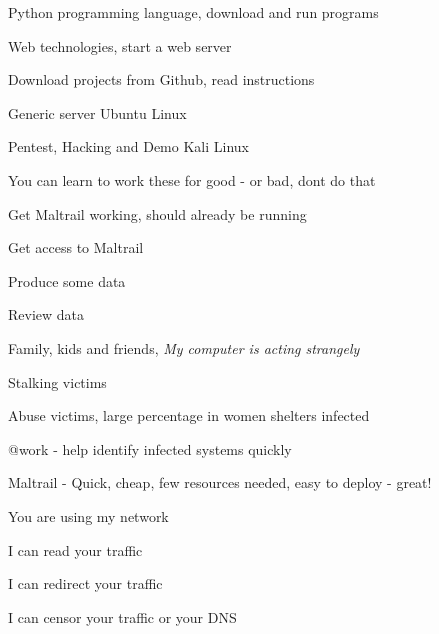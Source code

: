\documentclass[20pt,landscape,a4paper,footrule]{foils}
\begin{document}



\begin{list2}
\item Python programming language, download and run programs
\item Web technologies, start a web server
\item Download projects from Github, read instructions
\item Generic server Ubuntu Linux 
\item Pentest, Hacking and Demo Kali Linux 
\end{list2}

\vskip 5mm
\centerline{You can learn to work these for good - or bad, dont do that \smiley}







\begin{list2}
\item Get Maltrail working, should already be running
\item Get access to Maltrail
\item Produce some data
\item Review data
\end{list2}



\begin{list2}
\item Family, kids and friends, \emph{My computer is acting strangely}
\item Stalking victims
\item Abuse victims, large percentage in women shelters infected
\item @work - help identify infected systems quickly
\end{list2}

Maltrail - Quick, cheap, few resources needed, easy to deploy - great!


\begin{list2}
\item You are using my network \smiley
\item I can read your traffic
\item I can redirect your traffic
\item I can censor your traffic or your DNS
\end{list2}
\end{document}
